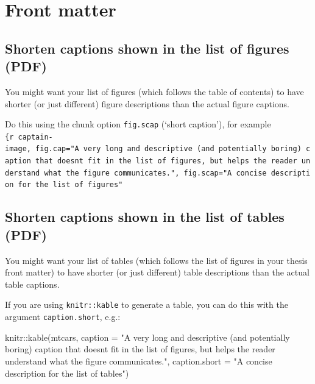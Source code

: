 \documentclass[a4paper, nobind]{templates/ociamthesis}
\newenvironment{Shaded}{\begin{snugshade}}{\end{snugshade}}
\newcommand{\AttributeTok}[1]{\textcolor[rgb]{0.77,0.63,0.00}{#1}}
\newcommand{\FunctionTok}[1]{\textcolor[rgb]{0.00,0.00,0.00}{#1}}
\newcommand{\NormalTok}[1]{#1}
\newcommand{\SpecialCharTok}[1]{\textcolor[rgb]{0.00,0.00,0.00}{#1}}
\newcommand{\StringTok}[1]{\textcolor[rgb]{0.31,0.60,0.02}{#1}}
\renewenvironment{Shaded}
{
  \vspace{10pt}%
  \begin{snugshade}%
}{%
  \end{snugshade}%
  \vspace{8pt}%
}
\begin{document}
\hypertarget{front-matter}{%
\section{Front matter}\label{front-matter}}

\hypertarget{shorten-captions-shown-in-the-list-of-figures-pdf}{%
\subsection{Shorten captions shown in the list of figures (PDF)}\label{shorten-captions-shown-in-the-list-of-figures-pdf}}

You might want your list of figures (which follows the table of contents) to have shorter (or just different) figure descriptions than the actual figure captions.

Do this using the chunk option \texttt{fig.scap} (`short caption'), for example \texttt{\{r\ captain-image,\ fig.cap="A\ very\ long\ and\ descriptive\ (and\ potentially\ boring)\ caption\ that\ doesn\textquotesingle{}t\ fit\ in\ the\ list\ of\ figures,\ but\ helps\ the\ reader\ understand\ what\ the\ figure\ communicates.",\ fig.scap="A\ concise\ description\ for\ the\ list\ of\ figures"}

\hypertarget{shorten-captions-shown-in-the-list-of-tables-pdf}{%
\subsection{Shorten captions shown in the list of tables (PDF)}\label{shorten-captions-shown-in-the-list-of-tables-pdf}}

You might want your list of tables (which follows the list of figures in your thesis front matter) to have shorter (or just different) table descriptions than the actual table captions.

If you are using \texttt{knitr::kable} to generate a table, you can do this with the argument \texttt{caption.short}, e.g.:

\begin{Shaded}
\begin{Highlighting}[]
\NormalTok{knitr}\SpecialCharTok{::}\FunctionTok{kable}\NormalTok{(mtcars,}
              \AttributeTok{caption =} \StringTok{"A very long and descriptive (and potentially}
\StringTok{              boring) caption that doesn\textquotesingle{}t fit in the list of figures,}
\StringTok{              but helps the reader understand what the figure }
\StringTok{              communicates."}\NormalTok{,}
              \AttributeTok{caption.short =} \StringTok{"A concise description for the list of tables"}\NormalTok{)}
\end{Highlighting}
\end{Shaded}
\end{document}
